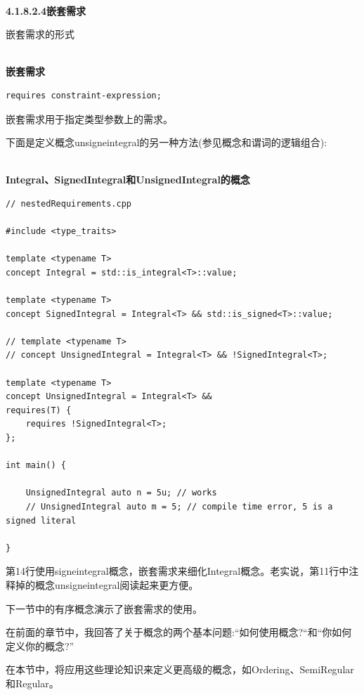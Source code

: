 \hspace*{\fill} \\ %
\noindent
\textbf{4.1.8.2.4\hspace{0.2cm}嵌套需求}

嵌套需求的形式

\hspace*{\fill} \\ %
\noindent
\textbf{嵌套需求}
\begin{lstlisting}[style=styleCXX]
requires constraint-expression;
\end{lstlisting}

嵌套需求用于指定类型参数上的需求。

下面是定义概念unsigneintegral的另一种方法(参见概念和谓词的逻辑组合):

\hspace*{\fill} \\ %
\noindent
\textbf{Integral、SignedIntegral和UnsignedIntegral的概念}
\begin{lstlisting}[style=styleCXX]
// nestedRequirements.cpp

#include <type_traits>

template <typename T>
concept Integral = std::is_integral<T>::value;

template <typename T>
concept SignedIntegral = Integral<T> && std::is_signed<T>::value;

// template <typename T>
// concept UnsignedIntegral = Integral<T> && !SignedIntegral<T>;

template <typename T>
concept UnsignedIntegral = Integral<T> &&
requires(T) {
	requires !SignedIntegral<T>;
};

int main() {

	UnsignedIntegral auto n = 5u; // works
	// UnsignedIntegral auto m = 5; // compile time error, 5 is a signed literal

}
\end{lstlisting}

第14行使用signeintegral概念，嵌套需求来细化Integral概念。老实说，第11行中注释掉的概念unsigneintegral阅读起来更方便。

下一节中的有序概念演示了嵌套需求的使用。


在前面的章节中，我回答了关于概念的两个基本问题:“如何使用概念?“和“你如何定义你的概念?”

在本节中，将应用这些理论知识来定义更高级的概念，如Ordering、SemiRegular和Regular。

